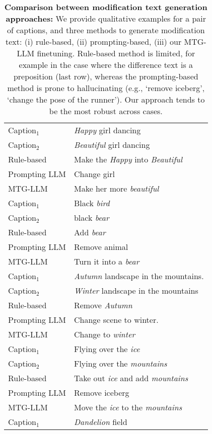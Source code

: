 \begin{table} \caption{\textbf{Comparison between modification text generation approaches:}
    We provide qualitative examples for a pair of captions, and three methods to generate
    modification text: (i) rule-based, (ii) prompting-based, (iii) our MTG-LLM finetuning.
    Rule-based method is limited, for example in the case where the difference text is a preposition (last row),
    whereas the prompting-based method is prone to hallucinating (e.g., `remove iceberg', `change the pose of the runner').
    Our approach tends to be the most robust across cases.}
    \label{tab:rule-based-comparision}
    \begin{tabular}{ll}
    \toprule
    Caption$_1$ & \textit{Happy} girl dancing \\
    Caption$_2$ & \textit{Beautiful} girl dancing \\
    Rule-based & Make the \textit{Happy} into \textit{Beautiful} \\
    Prompting LLM & Change girl \\
    MTG-LLM & Make her more \textit{beautiful} \\
    \midrule
    Caption$_1$ & Black \textit{bird} \\
    Caption$_2$ &  black \textit{bear} \\
    Rule-based & Add \textit{bear} \\
    Prompting LLM & Remove animal \\
    MTG-LLM & Turn it into a \textit{bear} \\
    \midrule
    Caption$_1$ & \textit{Autumn} landscape in the mountains. \\
    Caption$_2$ & \textit{Winter} landscape in the mountains \\
    Rule-based & Remove \textit{Autumn} \\
    Prompting LLM & Change scene to winter. \\
    MTG-LLM & Change to \textit{winter} \\
    \midrule
    Caption$_1$ & Flying over the \textit{ice} \\
    Caption$_2$ & Flying over the \textit{mountains} \\
    Rule-based & Take out \textit{ice} and add \textit{mountains} \\
    Prompting LLM & Remove iceberg \\
    MTG-LLM & Move the \textit{ice} to the \textit{mountains} \\
    \midrule
    Caption$_1$ & \textit{Dandelion} field \\

\end{tabular}
\end{table}
